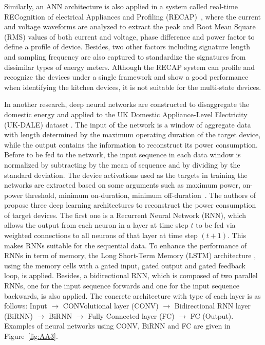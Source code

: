 Similarly, an ANN architecture is also applied in a system called real-time RECognition of electrical Appliances and Profiling (RECAP)~\cite{Ruzzelli10,Najmeddine08,Figueiredo11}, where the current and voltage waveforms are analyzed to extract the peak and Root Mean Square (RMS) values of both current and voltage, phase difference and power factor to define a profile of device. Besides, two other factors including signature length and sampling frequency are also captured to standardize the signatures from dissimilar types of energy meters. Although the RECAP system can profile and recognize the devices under a single framework and show a good performance when identifying the kitchen devices, it is not suitable for the multi-state devices.



In another research, deep neural networks are constructed to disaggregate the domestic energy \cite{KellyK15} and applied to the UK Domestic Appliance-Level Electricity (UK-DALE) dataset \cite{UK-DALE}. The input of the network is a window of aggregate data with length determined by the maximum operating duration of the target device, while the output contains the information to reconstruct its power consumption. Before to be fed to the network, the input sequence in each data window is normalized by subtracting by the mean of sequence and by dividing by the standard deviation. The device activations used as the targets in training the networks are extracted based on some arguments such as maximum power, on-power threshold, minimum on-duration, minimum off-duration~\cite{Batra14}. The authors of \cite{KellyK15} propose three deep learning architectures to reconstruct the power consumption of target devices. The first one is a Recurrent Neural Network (RNN), which allows the output from each neuron in a layer at time step $t$ to be fed via weighted connections to all neurons of that layer at time step $(t+1)$. This makes RNNs suitable for the sequential data. To enhance the performance of RNNs in term of memory, the Long Short-Term Memory (LSTM) architecture \cite{Hochreiter97}, using the memory cells with a gated input, gated output and gated feedback loop, is applied. Besides, a bidirectional RNN, which is composed of two parallel RNNs, one for the input sequence forwards and one for the input sequence backwards, is also applied. The concrete architecture with type of each layer is as follows: Input $\rightarrow$ CONVolutional layer (CONV) $\rightarrow$ Bidirectional RNN layer (BiRNN) $\rightarrow$ BiRNN $\rightarrow$ Fully Connected layer (FC) $\rightarrow$ FC (Output). Examples of neural networks using CONV, BiRNN and FC are given in Figure~\ref{fig:AA3}.


